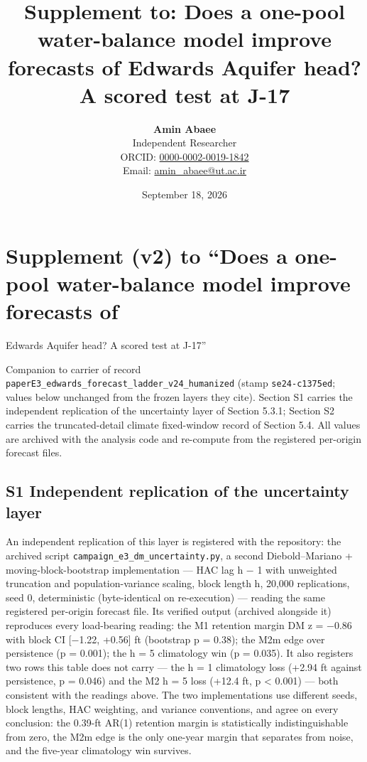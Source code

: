 \documentclass[11pt]{article}
\title{Supplement to: Does a one-pool water-balance model improve forecasts of Edwards Aquifer head? A scored test at J-17}
\author{\textbf{Amin Abaee}\\ Independent Researcher\\[2pt] ORCID: \href{https://orcid.org/0000-0002-0019-1842}{0000-0002-0019-1842}\\ Email: \href{mailto:amin_abaee@ut.ac.ir}{amin_abaee@ut.ac.ir}}
\date{September 18, 2026}
\begin{document}
\maketitle

\section{Supplement (v2) to ``Does a one-pool water-balance model
improve forecasts
of}\label{supplement-v2-to-does-a-one-pool-water-balance-model-improve-forecasts-of}

Edwards Aquifer head? A scored test at J-17''

Companion to carrier of record
\texttt{paperE3\_edwards\_forecast\_ladder\_v24\_humanized} (stamp
\texttt{se24-c1375ed}; values below unchanged from the frozen layers
they cite). Section S1 carries the independent replication of the
uncertainty layer of Section 5.3.1; Section S2 carries the
truncated-detail climate fixed-window record of Section 5.4. All values
are archived with the analysis code and re-compute from the registered
per-origin forecast files.

\subsection{S1 Independent replication of the uncertainty
layer}\label{s1-independent-replication-of-the-uncertainty-layer}

An independent replication of this layer is registered with the
repository: the archived script
\texttt{campaign\_e3\_dm\_uncertainty.py}, a second Diebold--Mariano +
moving-block-bootstrap implementation --- HAC lag h − 1 with unweighted
truncation and population-variance scaling, block length h, 20,000
replications, seed 0, deterministic (byte-identical on re-execution) ---
reading the same registered per-origin forecast file. Its verified
output (archived alongside it) reproduces every load-bearing reading:
the M1 retention margin DM z = −0.86 with block CI {[}−1.22, +0.56{]} ft
(bootstrap p = 0.38); the M2m edge over persistence (p = 0.001); the h =
5 climatology win (p = 0.035). It also registers two rows this table
does not carry --- the h = 1 climatology loss (+2.94 ft against
persistence, p = 0.046) and the M2 h = 5 loss (+12.4 ft, p \textless{}
0.001) --- both consistent with the readings above. The two
implementations use different seeds, block lengths, HAC weighting, and
variance conventions, and agree on every conclusion: the 0.39-ft AR(1)
retention margin is statistically indistinguishable from zero, the M2m
edge is the only one-year margin that separates from noise, and the
five-year climatology win survives.
\end{document}
